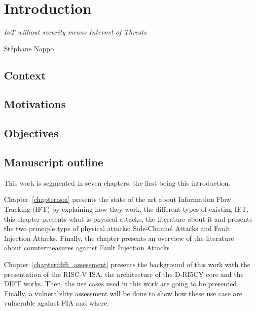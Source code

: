 \chapter{Introduction}
\label{chapter:introduction}

\epigraph{\textit{IoT without security means Internet of Threats}}{Stéphane Nappo}

\minitoc

\section{Context}

\section{Motivations}

\section{Objectives}

\section{Manuscript outline}

This work is segmented in seven chapters, the first being this introduction.

Chapter~\ref{chapter:soa} presents the state of the art about Information Flow Tracking (IFT) by explaining how they work, the different types of existing IFT, this chapter presents what is physical attacks, the literature about it and presents the two principle type of physical attacks: Side-Channel Attacks and Fault Injection Attacks. Finally, the chapter presents an overview of the literature about countermeasures against Fault Injection Attacks

Chapter~\ref{chapter:dift_assessment} presents the background of this work with the presentation of the RISC-V ISA, the architecture of the D-RI5CY core and the DIFT works. Then, the use cases used in this work are going to be presented. Finally, a vulnerability assessment will be done to show how these use case are vulnerable against FIA and where.


